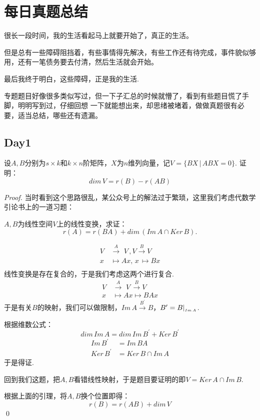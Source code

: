 
\chapter{每日真题总结}

\begin{introduction}
	\item 很长一段时间，我的生活看起马上就要开始了，真正的生活。
	\item 但是总有一些障碍阻挡着，有些事情得先解决，有些工作还有待完成，事件貌似够用，还有一笔债务要去付清，然后生活就会开始。
	\item 最后我终于明白，这些障碍，正是我的生活.
\end{introduction}

专题题目好像很多类似写过，但一下子汇总的时候就懵了，看到有些题目慌了手脚，明明写到过，仔细回想
一下就能想出来，却思绪被堵着，做做真题很有必要，适当总结，哪些还有遗漏。

\section*{Day1}

\begin{ex}[苏大2022]
	设$A,B$分别为$s \times k$和$k \times n$阶矩阵，$X$为$n$维列向量，记$V = \{ BX \,|\, ABX = 0 \}$. 证明：
	$$
		dim \, V = r(B) - r(AB)
	$$
\end{ex}

\begin{proof}
	当时看到这个思路很乱，某公众号上的解法过于繁琐，这里我们考虑代数学引论书上的一道习题：

	$A,B$为线性空间$V$上的线性变换，求证：
	$$
		r(A) = r(BA) + dim \, (Im \, A \cap Ker \, B).
	$$

	\begin{align*}
		V &\stackrel{A}{\longrightarrow } \,\,V\,, V \stackrel{B}{\longrightarrow} V\\
		x \,&\longmapsto  Ax, \,x\, \longmapsto Bx \\
	\end{align*}
	线性变换是存在复合的，于是我们考虑这两个进行复合.
	\begin{align*}
		V &\stackrel{A}{\longrightarrow } \,\,V\, \stackrel{B}{\longrightarrow } V \\
		x\, &\longmapsto  Ax \longmapsto BAx
	\end{align*}
	于是有关$B$的映射，我们可以做限制，$Im \, A \stackrel{B^\prime}{\longrightarrow } B$，$B^\prime = B|_{_{Im \, A}}$.

	根据维数公式：
	$$
		dim \, Im \, A = dim \, Im \, B^\prime + Ker \, B^\prime 
	$$
	\begin{align*}
		Im \, B^\prime &= Im \, BA \\
		Ker \, B^\prime &= Ker \, B \cap Im \, A
	\end{align*}
	于是得证.

	回到我们这题，把$A,B$看错线性映射，于是题目要证明的即$V = Ker \,A \cap Im \, B$.

	根据上面的引理，将$A,B$换个位置即得：
	$$
		r(B) = r(AB) + dim \, V
	$$
	\qed{}
\end{proof}

